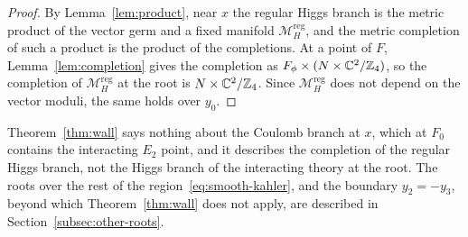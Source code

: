 \begin{proof}
By Lemma~\ref{lem:product}, near $x$ the regular Higgs branch is the metric product of the
vector germ and a fixed manifold $\mathcal M_H^{\mathrm{reg}}$, and the metric completion of such
a product is the product of the completions. At a point of $F$, Lemma~\ref{lem:completion}
gives the completion as $F_\phi\times(N\times\mathbb C^2/\mathbb Z_4)$, so the completion of
$\mathcal M_H^{\mathrm{reg}}$ at the root is $N\times\mathbb C^2/\mathbb Z_4$. Since
$\mathcal M_H^{\mathrm{reg}}$ does not depend on the vector moduli, the same holds over $y_0$.
\end{proof}

Theorem~\ref{thm:wall} says nothing about the Coulomb branch at $x$, which at $F_0$ contains the
interacting $E_2$ point, and it describes the completion of the regular Higgs branch, not the
Higgs branch of the interacting theory at the root. The roots over the rest of the
region~\eqref{eq:smooth-kahler}, and the boundary $y_2=-y_3$, beyond which Theorem~\ref{thm:wall} does not apply, are
described in Section~\ref{subsec:other-roots}.
